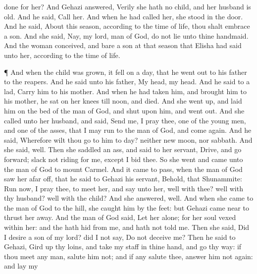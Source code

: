 {done for her? And
Gehazi
answered,
Verily she hath no
child, and her
husband is
old.
And he
said,
Call her. And when he had
called her, she
stood in the
door.
And he
said, About this
season, according to the
time of
life, thou shalt
embrace a
son. And she
said, Nay, my
lord,
{}
man of
God, do not
lie unto thine
handmaid.
And the
woman
conceived, and
bare a
son at that
season that
Elisha had
said unto her, according to the
time of
life.
\par }{\PP {}¶ And when the
child was
grown, it fell on a
day, that he went
out to his
father to the
reapers.
And he
said unto his
father, My
head, my
head. And he
said to a
lad,
Carry him to his
mother.
And when he had
taken him, and
brought him to his
mother, he
sat on her
knees till
noon, and
{}
died.
And she went
up, and
laid him on the
bed of the
man of
God, and
shut
{} upon him, and went
out.
And she
called unto her
husband, and
said,
Send me, I pray thee,
one of the young
men, and
one of the
asses, that I may
run to the
man of
God, and come
again.
And he
said, Wherefore wilt thou
go to him to
day?
{} neither new
moon, nor
sabbath. And she
said,
{}
well.
Then she
saddled an
ass, and
said to her
servant,
Drive, and go
forward;
slack not
{}
riding for me, except I
bid thee.
So she
went and
came unto the
man of
God to
mount
Carmel. And it came to pass, when the
man of
God saw her afar
off, that he
said to
Gehazi his
servant, Behold,
{}
that
Shunammite:
Run now, I pray thee, to
meet her, and
say unto her,
{}
well with thee?
{}
well with thy
husband?
{}
well with the
child? And she
answered,
{}
well.
And when she
came to the
man of
God to the
hill, she
caught him by the
feet: but
Gehazi came
near to thrust her
away. And the
man of
God
said, Let her
alone; for her
soul
{}
vexed within her: and the
{} hath
hid
{} from me, and hath not
told me.
Then she
said, Did I
desire a
son of my
lord? did I not
say, Do not
deceive me?
Then he
said to
Gehazi, Gird
up thy
loins, and
take my
staff in thine
hand, and go thy
way: if thou
meet any
man,
salute him not; and if
any
salute thee, answer him not
again: and
lay my
}
